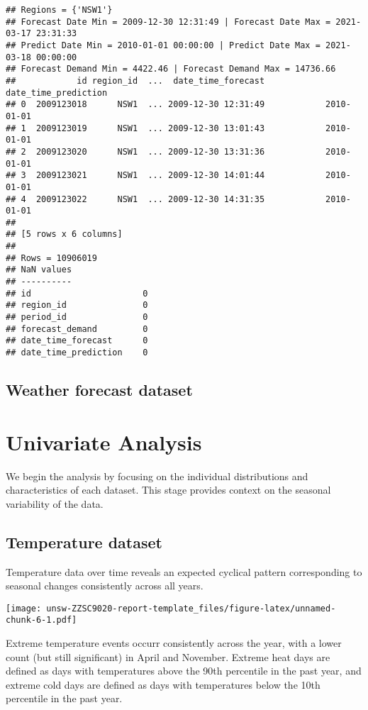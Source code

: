 \documentclass[mstat,12pt,a4paper]{unswthesis}
\begin{document}
\begin{verbatim}
## Regions = {'NSW1'}
## Forecast Date Min = 2009-12-30 12:31:49 | Forecast Date Max = 2021-03-17 23:31:33
## Predict Date Min = 2010-01-01 00:00:00 | Predict Date Max = 2021-03-18 00:00:00
## Forecast Demand Min = 4422.46 | Forecast Demand Max = 14736.66
##            id region_id  ...  date_time_forecast  date_time_prediction
## 0  2009123018      NSW1  ... 2009-12-30 12:31:49            2010-01-01
## 1  2009123019      NSW1  ... 2009-12-30 13:01:43            2010-01-01
## 2  2009123020      NSW1  ... 2009-12-30 13:31:36            2010-01-01
## 3  2009123021      NSW1  ... 2009-12-30 14:01:44            2010-01-01
## 4  2009123022      NSW1  ... 2009-12-30 14:31:35            2010-01-01
## 
## [5 rows x 6 columns]
## 
## Rows = 10906019
## NaN values 
## ----------
## id                      0
## region_id               0
## period_id               0
## forecast_demand         0
## date_time_forecast      0
## date_time_prediction    0
\end{verbatim}

\subsection{Weather forecast dataset}\label{weather-forecast-dataset}

\section{Univariate Analysis}\label{univariate-analysis}

We begin the analysis by focusing on the individual distributions and
characteristics of each dataset. This stage provides context on the
seasonal variability of the data.

\subsection{Temperature dataset}\label{temperature-dataset}

Temperature data over time reveals an expected cyclical pattern
corresponding to seasonal changes consistently across all years.

\texttt{[image: unsw-ZZSC9020-report-template\_files/figure-latex/unnamed-chunk-6-1.pdf]}

\bigskip

\noindent Extreme temperature events occurr consistently across the
year, with a lower count (but still significant) in April and November.
Extreme heat days are defined as days with temperatures above the 90th
percentile in the past year, and extreme cold days are defined as days
with temperatures below the 10th percentile in the past year.
\end{document}
